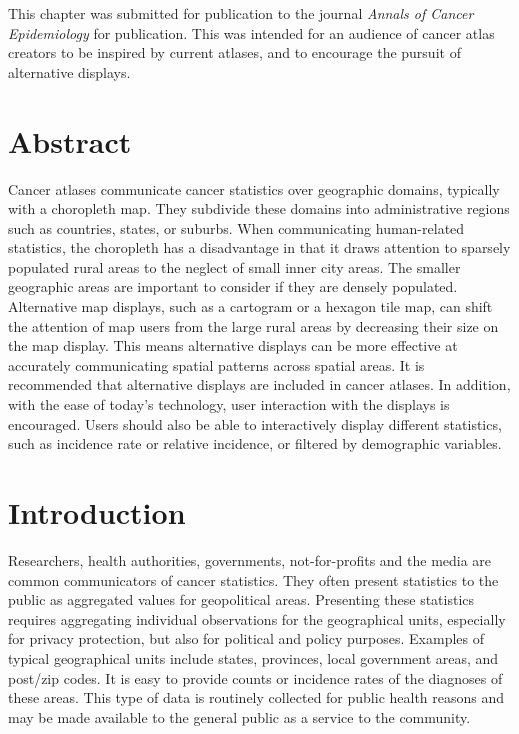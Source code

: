 \documentclass{monashthesis}
\begin{document}
This chapter was submitted for publication to the journal \emph{Annals of Cancer Epidemiology} for publication. This was intended for an audience of cancer atlas creators to be inspired by current atlases, and to encourage the pursuit of alternative displays.

\newpage

\hypertarget{abstract-1}{%
\section*{Abstract}\label{abstract-1}}

Cancer atlases communicate cancer statistics over geographic domains, typically with a choropleth map. They subdivide these domains into administrative regions such as countries, states, or suburbs. When communicating human-related statistics, the choropleth has a disadvantage in that it draws attention to sparsely populated rural areas to the neglect of small inner city areas. The smaller geographic areas are important to consider if they are densely populated. Alternative map displays, such as a cartogram or a hexagon tile map, can shift the attention of map users from the large rural areas by decreasing their size on the map display. This means alternative displays can be more effective at accurately communicating spatial patterns across spatial areas. It is recommended that alternative displays are included in cancer atlases. In addition, with the ease of today's technology, user interaction with the displays is encouraged. Users should also be able to interactively display different statistics, such as incidence rate or relative incidence, or filtered by demographic variables.

\hypertarget{introduction}{%
\section{Introduction}\label{introduction}}

Researchers, health authorities, governments, not-for-profits and the media are common communicators of cancer statistics. They often present statistics to the public as aggregated values for geopolitical areas. Presenting these statistics requires aggregating individual observations for the geographical units, especially for privacy protection, but also for political and policy purposes. Examples of typical geographical units include states, provinces, local government areas, and post/zip codes. It is easy to provide counts or incidence rates of the diagnoses of these areas. This type of data is routinely collected for public health reasons and may be made available to the general public as a service to the community.
\end{document}
